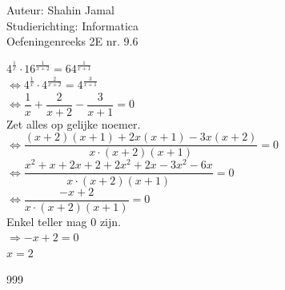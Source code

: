 \documentclass[a4paper]{article}
\begin{document}
  
\noindent \large Auteur: Shahin Jamal \\
\noindent \large Studierichting: Informatica\\
\noindent \large Oefeningenreeks 2E nr. 9.6\\

\medskip

\normalsize

$4^{\tfrac{1}{x}} \cdot 16^{\tfrac{1}{x+2}} = 64^{\tfrac{1}{x+1}}$\\

$\Leftrightarrow 4^{\tfrac{1}{x}} \cdot 4^{\tfrac{2}{x+2}} = 4^{\tfrac{3}{x+1}}$\\

$\Leftrightarrow \dfrac{1}{x} + \dfrac{2}{x+2} - \dfrac{3}{x+1} = 0$\\

Zet alles op gelijke noemer.\\

$\Leftrightarrow \dfrac{(x+2)(x+1) + 2x(x+1) - 3x(x+2)}{x\cdot(x+2)(x+1)} = 0$\\

$\Leftrightarrow \dfrac{x^2+x+2x+2+2x^2+2x-3x^2-6x}{x\cdot(x+2)(x+1)} = 0$\\

$\Leftrightarrow \dfrac{-x+2}{x\cdot(x+2)(x+1)} = 0$\\

Enkel teller mag 0 zijn.\\

$\Rightarrow -x+2=0$\\

$x=2$\\

\begin{thebibliography}{999}
\end{thebibliography}
\end{document}
